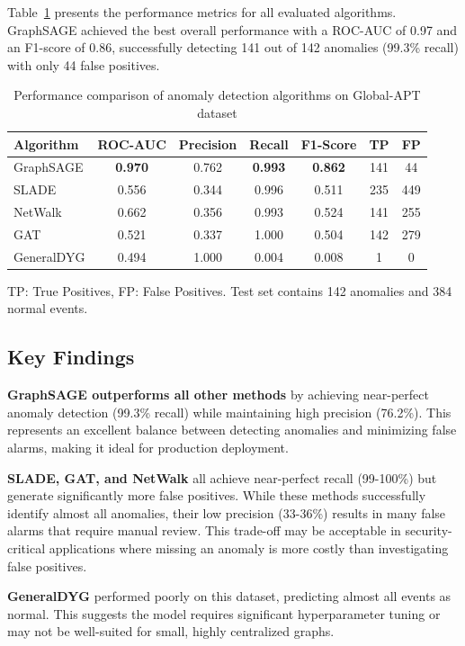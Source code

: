 Table~\ref{tab:results} presents the performance metrics for all evaluated algorithms. GraphSAGE achieved the best overall performance with a ROC-AUC of 0.97 and an F1-score of 0.86, successfully detecting 141 out of 142 anomalies (99.3\% recall) with only 44 false positives.

\begin{table}[htbp]
\centering
\caption{Performance comparison of anomaly detection algorithms on Global-APT dataset}
\label{tab:results}
\begin{tabular}{lcccccc}
\toprule
\textbf{Algorithm} & \textbf{ROC-AUC} & \textbf{Precision} & \textbf{Recall} & \textbf{F1-Score} & \textbf{TP} & \textbf{FP} \\
\midrule
GraphSAGE & \textbf{0.970} & 0.762 & \textbf{0.993} & \textbf{0.862} & 141 & 44 \\
SLADE & 0.556 & 0.344 & 0.996 & 0.511 & 235 & 449 \\
NetWalk & 0.662 & 0.356 & 0.993 & 0.524 & 141 & 255 \\
GAT & 0.521 & 0.337 & 1.000 & 0.504 & 142 & 279 \\
GeneralDYG & 0.494 & 1.000 & 0.004 & 0.008 & 1 & 0 \\
\bottomrule
\end{tabular}
\vspace{0.1cm}
\footnotesize
TP: True Positives, FP: False Positives. Test set contains 142 anomalies and 384 normal events.
\end{table}

\subsection{Key Findings}

\textbf{GraphSAGE outperforms all other methods} by achieving near-perfect anomaly detection (99.3\% recall) while maintaining high precision (76.2\%). This represents an excellent balance between detecting anomalies and minimizing false alarms, making it ideal for production deployment.

\textbf{SLADE, GAT, and NetWalk} all achieve near-perfect recall (99-100\%) but generate significantly more false positives. While these methods successfully identify almost all anomalies, their low precision (33-36\%) results in many false alarms that require manual review. This trade-off may be acceptable in security-critical applications where missing an anomaly is more costly than investigating false positives.

\textbf{GeneralDYG} performed poorly on this dataset, predicting almost all events as normal. This suggests the model requires significant hyperparameter tuning or may not be well-suited for small, highly centralized graphs.


